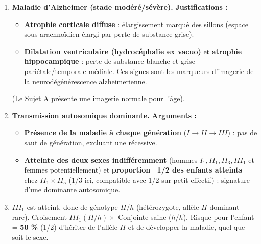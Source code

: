 \documentclass[11pt]{article}
\begin{document}
\begin{corrige}
\begin{enumerate}
\item \textbf{Maladie d'Alzheimer (stade modéré/sévère).}
  \textbf{Justifications :}
  \begin{itemize}
  \item \textbf{Atrophie corticale diffuse} : élargissement marqué des sillons (espace sous-arachnoïdien élargi par perte de substance grise).
  \item \textbf{Dilatation ventriculaire (hydrocéphalie ex vacuo)} et \textbf{atrophie hippocampique} : perte de substance blanche et grise pariétale/temporale médiale. Ces signes sont les marqueurs d'imagerie de la neurodégénérescence alzheimerienne.
  \end{itemize}
  (Le Sujet A présente une imagerie normale pour l'âge).
\item \textbf{Transmission autosomique dominante.}
  \textbf{Arguments :}
  \begin{itemize}
  \item \textbf{Présence de la maladie à chaque génération} ($I \rightarrow II \rightarrow III$) : pas de saut de génération, excluant une récessive.
  \item \textbf{Atteinte des deux sexes indifféremment} (hommes $I_1, II_1, II_3, III_1$ et femmes potentiellement) et \textbf{proportion ~1/2 des enfants atteints} chez $II_1 \times II_5$ (1/3 ici, compatible avec 1/2 sur petit effectif) : signature d'une dominante autosomique.
  \end{itemize}
\item $III_1$ est atteint, donc de génotype \textbf{$H/h$} (hétérozygote, allèle $H$ dominant rare).
  Croisement $III_1 (H/h) \times$ Conjointe saine ($h/h$).
  Risque pour l'enfant = \textbf{50 \%} (1/2) d'hériter de l'allèle $H$ et de développer la maladie, quel que soit le sexe.
\end{enumerate}
\end{corrige}
\end{document}
